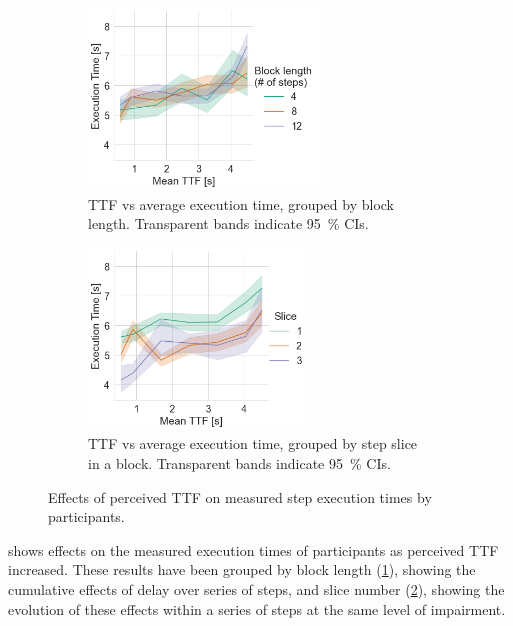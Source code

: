 \begin{figure}[tb]
    \centering
    \begin{subfigure}[t]{0.45\textwidth}
        \includegraphics[height=13em]{./Figs/2021Impact/ttf_vs_exectime_per_block}
        \caption{%
            \gls{TTF} vs average execution time, grouped by block length.
            Transparent bands indicate \SI{95}{\percent} \glspl{CI}.
        }\label{fig:ttfvsexectime:block}
    \end{subfigure}%
    \hfill%
    \begin{subfigure}[t]{0.45\textwidth}
        \includegraphics[height=13em]{./Figs/2021Impact/ttf_vs_exectime_per_slice}
        \caption{%
            \gls{TTF} vs average execution time, grouped by step slice in a block.
            Transparent bands indicate \SI{95}{\percent} \glspl{CI}.
        }\label{fig:ttfvsexectime:slice}
    \end{subfigure}%
    \caption{Effects of perceived \gls{TTF} on measured step execution times by participants.}\label{fig:ttfvsexectime}
\end{figure}

 shows effects on the measured execution times of participants as perceived \gls{TTF} increased.
These results have been grouped by block length (\cref{fig:ttfvsexectime:block}), showing the cumulative effects of delay over series of steps, and slice number (\cref{fig:ttfvsexectime:slice}), showing the evolution of these effects within a series of steps at the same level of impairment.

